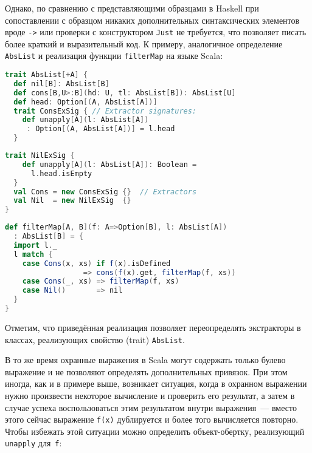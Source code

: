 Однако, по сравнению с представляющими образцами в Haskell при сопоставлении с образцом никаких дополнительных синтаксических элементов вроде \lstinline|->| или проверки с конструктором \lstinline|Just| не требуется, что позволяет писать более краткий и выразительный код. К примеру, аналогичное определение \lstinline|AbsList| и реализация функции \lstinline|filterMap| на языке Scala:

\noindent
\begin{minipage}{\linewidth}
\begin{lstlisting}[language=scala]
trait AbsList[+A] {
  def nil[B]: AbsList[B]
  def cons[B,U>:B](hd: U, tl: AbsList[B]): AbsList[U]
  def head: Option[(A, AbsList[A])]
  trait ConsExSig { // Extractor signatures:
    def unapply[A](l: AbsList[A])
     : Option[(A, AbsList[A])] = l.head
  }
\end{lstlisting}
\end{minipage}

\noindent
\begin{minipage}{\linewidth}
\begin{lstlisting}[language=scala]
  trait NilExSig {
    def unapply[A](l: AbsList[A]): Boolean = 
      l.head.isEmpty
  }
  val Cons = new ConsExSig {}  // Extractors
  val Nil  = new NilExSig  {}
}
\end{lstlisting}
\end{minipage}

\noindent
\begin{minipage}{\linewidth}
\begin{lstlisting}[language=scala]
def filterMap[A, B](f: A=>Option[B], l: AbsList[A])
  : AbsList[B] = {
  import l._
  l match {
    case Cons(x, xs) if f(x).isDefined
                  => cons(f(x).get, filterMap(f, xs))
    case Cons(_, xs) => filterMap(f, xs)
    case Nil()       => nil
  }
}
\end{lstlisting}
\end{minipage}

Отметим, что приведённая реализация позволяет переопределять экстракторы в классах, реализующих свойство (trait) \lstinline|AbsList|.

В то же время охранные выражения в Scala могут содержать только булево выражение и не позволяют определять дополнительных привязок. При этом иногда, как и в примере выше, возникает ситуация, когда в охранном выражении нужно произвести некоторое вычисление и проверить его результат, а затем в случае успеха воспользоваться этим результатом внутри выражения~--- вместо этого сейчас выражение \lstinline|f(x)| дублируется и более того вычисляется повторно. Чтобы избежать этой ситуации можно определить объект-обертку, реализующий \lstinline|unapply| \mbox{для \lstinline|f|:}

